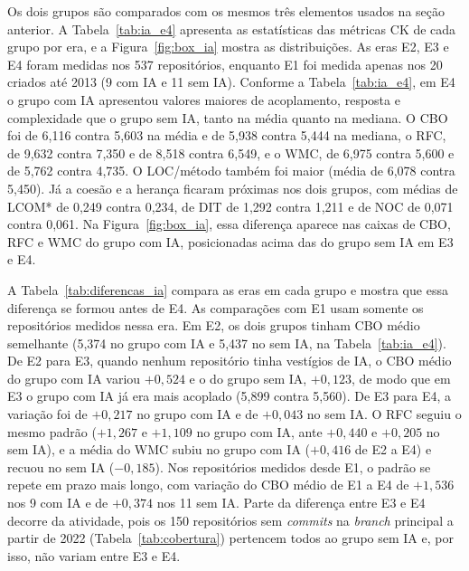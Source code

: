 Os dois grupos são comparados com os mesmos três elementos usados na seção anterior. A Tabela~\ref{tab:ia_e4} apresenta as estatísticas das métricas CK de cada grupo por era, e a Figura~\ref{fig:box_ia} mostra as distribuições. As eras E2, E3 e E4 foram medidas nos 537 repositórios, enquanto E1 foi medida apenas nos 20 criados até 2013 (9 com IA e 11 sem IA). Conforme a Tabela~\ref{tab:ia_e4}, em E4 o grupo com IA apresentou valores maiores de acoplamento, resposta e complexidade que o grupo sem IA, tanto na média quanto na mediana. O CBO foi de 6,116 contra 5,603 na média e de 5,938 contra 5,444 na mediana, o RFC, de 9,632 contra 7,350 e de 8,518 contra 6,549, e o WMC, de 6,975 contra 5,600 e de 5,762 contra 4,735. O LOC/método também foi maior (média de 6,078 contra 5,450). Já a coesão e a herança ficaram próximas nos dois grupos, com médias de LCOM* de 0,249 contra 0,234, de DIT de 1,292 contra 1,211 e de NOC de 0,071 contra 0,061. Na Figura~\ref{fig:box_ia}, essa diferença aparece nas caixas de CBO, RFC e WMC do grupo com IA, posicionadas acima das do grupo sem IA em E3 e E4.




A Tabela~\ref{tab:diferencas_ia} compara as eras em cada grupo e mostra que essa diferença se formou antes de E4. As comparações com E1 usam somente os repositórios medidos nessa era. Em E2, os dois grupos tinham CBO médio semelhante (5,374 no grupo com IA e 5,437 no sem IA, na Tabela~\ref{tab:ia_e4}). De E2 para E3, quando nenhum repositório tinha vestígios de IA, o CBO médio do grupo com IA variou $+0{,}524$ e o do grupo sem IA, $+0{,}123$, de modo que em E3 o grupo com IA já era mais acoplado (5,899 contra 5,560). De E3 para E4, a variação foi de $+0{,}217$ no grupo com IA e de $+0{,}043$ no sem IA. O RFC seguiu o mesmo padrão ($+1{,}267$ e $+1{,}109$ no grupo com IA, ante $+0{,}440$ e $+0{,}205$ no sem IA), e a média do WMC subiu no grupo com IA ($+0{,}416$ de E2 a E4) e recuou no sem IA ($-0{,}185$). Nos repositórios medidos desde E1, o padrão se repete em prazo mais longo, com variação do CBO médio de E1 a E4 de $+1{,}536$ nos 9 com IA e de $+0{,}374$ nos 11 sem IA. Parte da diferença entre E3 e E4 decorre da atividade, pois os 150 repositórios sem \emph{commits} na \emph{branch} principal a partir de 2022 (Tabela~\ref{tab:cobertura}) pertencem todos ao grupo sem IA e, por isso, não variam entre E3 e E4.



